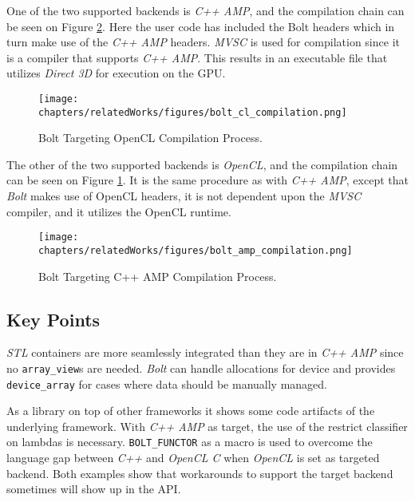One of the two supported backends is \textit{C++ AMP}, and the compilation chain can be seen on Figure \ref{fig:boltAmpCompilation}. Here the user code has included the Bolt headers which in turn make use of the \textit{C++ AMP} headers. \textit{MVSC} is used for compilation since it is a compiler that supports \textit{C++ AMP}. This results in an executable file that utilizes \textit{Direct 3D} for execution on the GPU.

\begin{figure}[H]
\center
\texttt{[image: chapters/relatedWorks/figures/bolt\_cl\_compilation.png]}
\caption{Bolt Targeting OpenCL Compilation Process.}
\label{fig:boltClCompilation}
\end{figure}

The other of the two supported backends is \textit{OpenCL}, and the compilation chain can be seen on Figure \ref{fig:boltClCompilation}. It is the same procedure as with \textit{C++ AMP}, except that \textit{Bolt} makes use of OpenCL headers, it is not dependent upon the \textit{MVSC} compiler, and it  utilizes the OpenCL runtime.

\begin{figure}
\center
\texttt{[image: chapters/relatedWorks/figures/bolt\_amp\_compilation.png]}
\caption{Bolt Targeting C++ AMP Compilation Process.}
\label{fig:boltAmpCompilation}
\end{figure}

\subsection{Key Points}
\textit{STL} containers are more seamlessly integrated than they are in \textit{C++ AMP} since no \texttt{array\_view}s are needed. \textit{Bolt} can handle allocations for device and provides \texttt{device\_array} for cases where data should be manually managed.

As a library on top of other frameworks it shows some code artifacts of the underlying framework. With \textit{C++ AMP} as target, the use of the restrict classifier on lambdas is necessary. \texttt{BOLT\_FUNCTOR} as a macro is used to overcome the language gap between \textit{C++} and \textit{OpenCL C} when \textit{OpenCL} is set as targeted backend. Both examples show that workarounds to support the target backend sometimes will show up in the API. 
